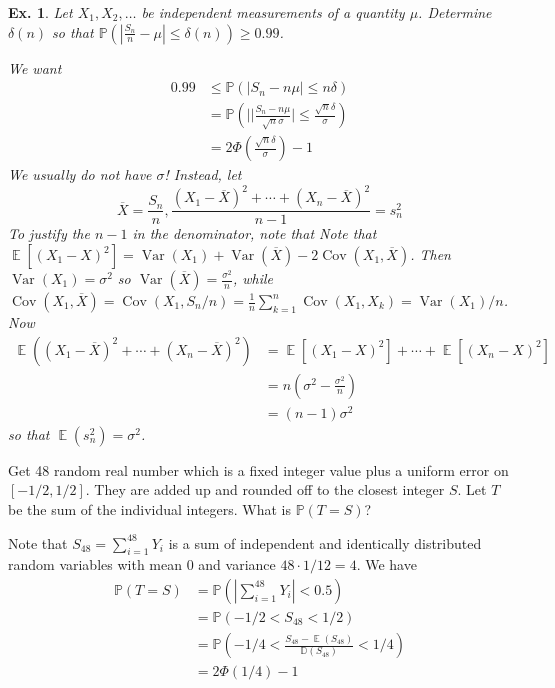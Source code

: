 \documentclass[12pt, a4paper]{book}
\DeclareMathOperator{\E}{\mathbb{E}}
\DeclareMathOperator{\Var}{Var}
\DeclareMathOperator{\Cov}{Cov}
\renewcommand{\Pr}{\mathbb{P}}
\newtheorem{example}[theorem]{Ex.}
\theoremstyle{nonumberplain}
\begin{document}
\begin{example}
    Let $X_1,X_2,\ldots$ be independent measurements of a quantity $\mu$.
    Determine $\delta(n)$ so that $\Pr\left(\left\lvert\frac{S_n}{n}-\mu\right\rvert\leq\delta(n)\right)\geq 0.99$.

    We want
    \begin{align*}
        0.99 &\leq \Pr(|S_n-n\mu|\leq n\delta)\\
             &= \Pr\left(\lvert|\frac{S_n-n\mu}{\sqrt{n}\sigma}\rvert\leq\frac{\sqrt{n}\delta}{\sigma}\right)\\
             &= 2\Phi\left(\frac{\sqrt{n}\delta}{\sigma}\right)-1
    \end{align*}
    We usually do not have $\sigma$!
    Instead, let
    \[\overline{X}=\frac{S_n}{n},\frac{(X_1-\overline{X})^2+\cdots+(X_n-\overline{X})^2}{n-1}=s_n^2\]
    To justify the $n-1$ in the denominator, note that
    Note that $\E[(X_1-X)^2]=\Var(X_1)+\Var(\overline{X})-2\Cov(X_1,\overline{X})$.
    Then $\Var(X_1)=\sigma^2$ so $\Var(\overline{X})=\frac{\sigma^2}{n}$, while $\Cov(X_1,\overline{X})=\Cov(X_1,S_n/n)=\frac{1}{n}\sum\limits_{k=1}^n\Cov(X_1,X_k)=\Var(X_1)/n$.
    Now
    \begin{align*}
        \E((X_1-\overline{X})^2+\cdots+(X_n-\overline{X})^2)&=\E[(X_1-X)^2]+\cdots+\E[(X_n-X)^2]\\
                                                            &= n\left(\sigma^2-\frac{\sigma^2}{n}\right)\\
                                                            &= (n-1)\sigma^2
    \end{align*}
    so that $\E(s_n^2)=\sigma^2$.
\end{example}
Get 48 random real number which is a fixed integer value plus a uniform error on $[-1/2,1/2]$.
They are added up and rounded off to the closest integer $S$.
Let $T$ be the sum of the individual integers.
What is $\Pr(T=S)$?

Note that $S_{48}=\sum\limits_{i=1}^{48}Y_i$ is a sum of independent and identically distributed random variables with mean 0 and variance $48\cdot 1/12=4$.
We have
\begin{align*}
    \Pr(T=S) &= \Pr\left(\left\lvert\sum\limits_{i=1}^{48}Y_i\right\rvert<0.5\right)\\
             &= \Pr(-1/2<S_{48}<1/2)\\
             &= \Pr\left(-1/4<\frac{S_{48}-\E(S_{48})}{\mathbb{D}(S_{48})}<1/4\right)\\
             &= 2\Phi(1/4)-1
\end{align*}
\end{document}
